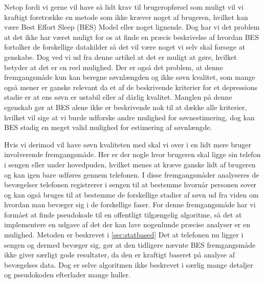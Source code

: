Netop fordi vi gerne vil have så lidt krav til brugeropførsel som muligt vil vi kraftigt foretrække en metode som ikke kræver noget af brugeren, hvilket kan være Best Effort Sleep (BES) Model eller noget lignende. 
Dog har vi det problem at det ikke har været muligt for os at finde en præcis beskrivelse af hvordan BES fortolker de forskellige datakilder så det vil være noget vi selv skal forsøge at genskabe.
Dog ved vi ud fra denne artikel at det er muligt at gøre, hvilket betyder at det er en reel mulighed.
Der er også det problem, at denne fremgangsmåde kun kan beregne søvnlængden og ikke søvn kvalitet, som mange også mener er ganske relevant da et af de beskrivende kriterier for et depressions stadie er at ens søvn er ustabil eller af dårlig kvalitet.
Manglen på denne egenskab gør at BES alene ikke er beskrivende nok til at dække alle kriterier, hvilket vil sige at vi burde udforske andre mulighed for søvnestimering, dog kan BES stadig en meget valid mulighed for estimering af søvnlængde.

Hvis vi derimod vil have søvn kvaliteten med skal vi over i en lidt mere bruger involverende fremgangsmåde.
Her er der nogle hvor brugeren skal ligge sin telefon i sengen eller under hovedpuden, hvilket menes at kræve ganske lidt af brugeren og kan igen bare udføres gennem telefonen.
I disse fremgangsmåder analyseres de bevægelser telefonen registrerer i sengen til at bestemme hvornår personen sover og kan også bruges til at bestemme de forskellige stadier af søvn ud fra viden om hvordan man bevæger sig i de forskellige faser.
For denne fremgangsmåde har vi formået at finde pseudokode til en offentligt tilgængelig algoritme, så det at implementere en udgave af det der kan lave nogenlunde præcise analyser er en mulighed.
Metoden er beskrevet i \cref{sec:statbased}
Det at telefonen nu ligger i sengen og dermed bevæger sig, gør at den tidligere nævnte BES fremgangsmåde ikke giver særligt gode resultater, da den er kraftigt baseret på analyse af bevægelses data.
Dog er selve algoritmen ikke beskrevet i særlig mange detaljer og pseudokoden efterlader mange huller.

